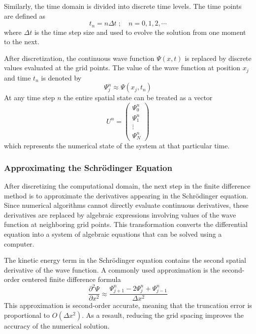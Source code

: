 \documentclass[11pt]{article}
\begin{document}
Similarly, the time domain is divided into discrete time levels. The time points are defined as 
\begin{equation}
	t_n = n \Delta t \; ; \quad n = 0, 1, 2, \cdots
\end{equation}
where $\Delta t$ is the time step size and used to evolve the solution from one moment to the next.

After discretization, the continuous wave function $\Psi (x,t)$ is replaced by discrete values evaluated at the grid points. The value of the wave function at position $x_j$ and time $t_n$ is denoted by
\begin{equation}
	\Psi_j^n \approx \Psi (x_j, t_n)
\end{equation}
At any time step $n$ the entire spatial state can be treated as a vector 
\begin{equation}
	U^n = \begin{pmatrix} \Psi_0^n \\ \Psi_1^n \\ \vdots \\ \Psi_N^n \end{pmatrix}
\end{equation}
which represents the numerical state of the system at that particular time.

\subsubsection{Approximating the Schrödinger Equation}
After discretizing the computational domain, the next step in the finite difference method is to approximate the derivatives appearing in the Schrödinger equation. Since numerical algorithms cannot directly evaluate continuous derivatives, these derivatives are replaced by algebraic expressions involving values of the wave function at neighboring grid points. This transformation converts the differential equation into a system of algebraic equations that can be solved using a computer.

The kinetic energy term in the Schrödinger equation contains the second spatial derivative of the wave function. A commonly used approximation is the second-order centered finite difference formula
\begin{equation}
	\frac{\partial^2 \Psi}{\partial x^2} \approx \frac{\Psi_{j+1}^n - 2 \Psi_j^n + \Psi_{j-1}^n}{\Delta x^2}
\end{equation}
This approximation is second-order accurate, meaning that the truncation error is proportional to $O(\Delta x^2)$. As a resault, reducing the grid spacing improves the accuracy of the numerical solution.
\end{document}
